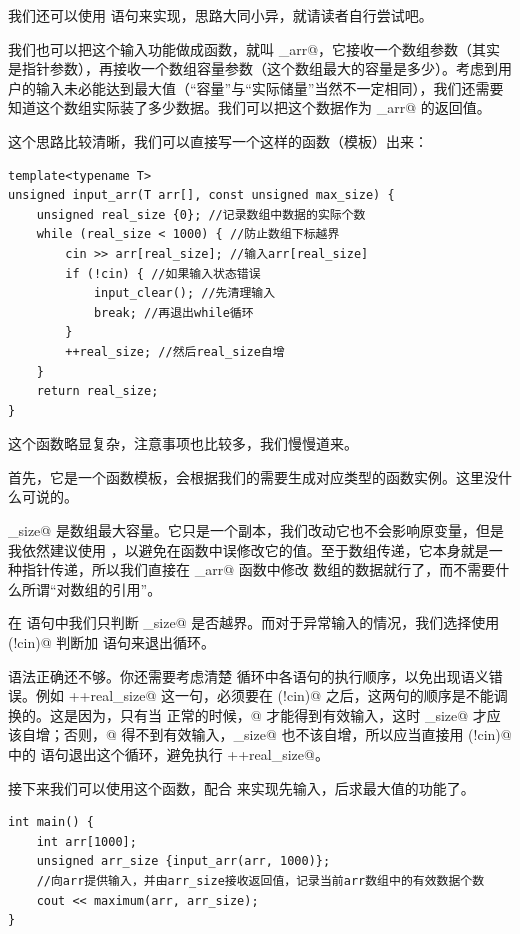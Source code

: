 我们还可以使用 \lstinline@while@ 语句来实现，思路大同小异，就请读者自行尝试吧。\par
我们也可以把这个输入功能做成函数，就叫 \lstinline@input_arr@，它接收一个数组参数（其实是指针参数），再接收一个数组容量参数（这个数组最大的容量是多少）。考虑到用户的输入未必能达到最大值（``容量''与``实际储量''当然不一定相同），我们还需要知道这个数组实际装了多少数据。我们可以把这个数据作为 \lstinline@input_arr@ 的返回值。\par\pagebreak
这个思路比较清晰，我们可以直接写一个这样的函数（模板）出来：
\begin{lstlisting}
template<typename T>
unsigned input_arr(T arr[], const unsigned max_size) {
    unsigned real_size {0}; //记录数组中数据的实际个数
    while (real_size < 1000) { //防止数组下标越界
        cin >> arr[real_size]; //输入arr[real_size]
        if (!cin) { //如果输入状态错误
            input_clear(); //先清理输入
            break; //再退出while循环
        }
        ++real_size; //然后real_size自增
    }
    return real_size;
}
\end{lstlisting}
这个函数略显复杂，注意事项也比较多，我们慢慢道来。\par
首先，它是一个函数模板，会根据我们的需要生成对应类型的函数实例。这里没什么可说的。\par
\lstinline@max_size@ 是数组最大容量。它只是一个副本，我们改动它也不会影响原变量，但是我依然建议使用 \lstinline@const@，以避免在函数中误修改它的值。至于数组传递，它本身就是一种指针传递，所以我们直接在 \lstinline@input_arr@ 函数中修改 \lstinline@arr@ 数组的数据就行了，而不需要什么所谓``对数组的引用''。\par
在 \lstinline@while@ 语句中我们只判断 \lstinline@real_size@ 是否越界。而对于异常输入的情况，我们选择使用 \lstinline@if(!cin)@ 判断加 \lstinline@break@ 语句来退出循环。\par
语法正确还不够。你还需要考虑清楚 \lstinline@while@ 循环中各语句的执行顺序，以免出现语义错误。例如 \lstinline@++real_size@ 这一句，必须要在 \lstinline@if(!cin)@ 之后，这两句的顺序是不能调换的。这是因为，只有当 \lstinline@cin@ 正常的时候，@ 才能得到有效输入，这时 \lstinline@real_size@ 才应该自增；否则，@ 得不到有效输入，\lstinline@real_size@ 也不该自增，所以应当直接用 \lstinline@if(!cin)@ 中的 \lstinline@break@ 语句退出这个循环，避免执行 \lstinline@++real_size@。\par
接下来我们可以使用这个函数，配合 \lstinline@maximum@ 来实现先输入，后求最大值的功能了。\par
\begin{lstlisting}
int main() {
    int arr[1000];
    unsigned arr_size {input_arr(arr, 1000)};
    //向arr提供输入，并由arr_size接收返回值，记录当前arr数组中的有效数据个数
    cout << maximum(arr, arr_size);
}
\end{lstlisting}\par
